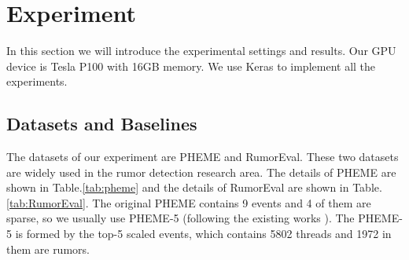 \section{Experiment}
\label{sec:experiment}
In this section we will introduce the experimental settings and results. Our GPU device is Tesla P100 with 16GB memory. We use Keras to implement all the experiments.

\subsection{Datasets and Baselines}
\label{sec:dataset}
The datasets of our experiment are  PHEME \cite{DBLP:conf/coling/KochkinaLZ18} and RumorEval\cite{DBLP:conf/semeval/EnayetE17}. These two datasets are widely used in the rumor detection research area. The details of PHEME are shown in Table.\ref{tab:pheme} and the details of RumorEval are shown in Table.\ref{tab:RumorEval}. The original PHEME contains 9 events and 4 of them are sparse, so we usually use PHEME-5 (following the existing works \cite{DBLP:conf/www/ChengNB20}). The PHEME-5 is formed by the top-5 scaled events, which contains 5802 threads and 1972 in them are rumors. 

\begin{table}[htbp]
	\caption{PHEME}
	\centering
	\label{tab:pheme}
\end{table}

\begin{table}[tbp]
	\caption{RumorEval}
	\centering
	\label{tab:RumorEval}
\end{table}

